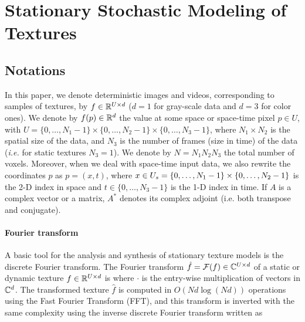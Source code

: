 \section{Stationary Stochastic Modeling of Textures}
\label{sec-stat-model-tetxures}


\subsection{Notations}

In this paper, we denote deterministic images and videos, corresponding to samples of textures, by $f \in \mathbb{R}^{U \times d}$ ($d=1$ for gray-scale data and $d=3$ for color ones). We denote by $f(p) \in \mathbb{R}^d$ the value at some space or space-time pixel $p \in U$, with $ U = \{0,\ldots, N_1-1\}\times \{0,\ldots,N_2-1\} \times \{0,\ldots, N_3-1\}$, where $N_1 \times N_2$ is the spatial size of the data, and $N_3$ is the number of frames (size in time) of the data (\emph{i.e.} for static textures $N_3 = 1$).  We denote by $N=N_1 N_2 N_3$ the total number of voxels. Moreover, when we deal with space-time input data, we also rewrite the coordinates $p$ as $ p = (x, t)$, where $x \in U_s = \{0,\ldots, N_1-1\}\times \{0,\ldots,N_2-1\}$ is the 2-D index in space and $t \in \{0,\ldots, N_3-1\}$ is the 1-D index in time. If $A$ is a complex vector or a matrix, $A^*$ denotes its complex adjoint (i.e. both transpose and conjugate).

\paragraph{Fourier transform}

A basic tool for the analysis and synthesis of stationary texture models is the discrete Fourier transform. The Fourier transform $\hat f = \mathcal{F}(f) \in \mathbb{C}^{U \times d}$ of a static or dynamic texture $f \in \mathbb{R}^{U \times d}$ is
where $\cdot$ is the entry-wise multiplication of vectors in $\mathbb{C}^d$.
The transformed texture $\hat f$ is computed in $O(N d \log(N d))$ operations using the Fast Fourier Transform (FFT), and this transform is inverted with the same complexity using the inverse discrete Fourier transform written as


